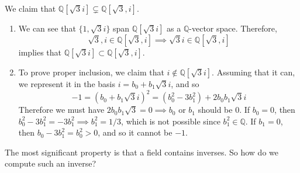   \begin{example}
    We claim that $\mathbb{Q}[\sqrt{3} i] \subsetneq \mathbb{Q}[\sqrt{3}, i]$. 
    \begin{enumerate}
      \item We can see that $\{1, \sqrt{3}i \}$ span $\mathbb{Q}[\sqrt{3}i ]$ as a $\mathbb{Q}$-vector space. Therefore, 
      \begin{equation}
        \sqrt{3}, i \in \mathbb{Q}[\sqrt{3}, i] \implies \sqrt{3} i \in \mathbb{Q}[\sqrt{3}, i]
      \end{equation} 
      implies that $\mathbb{Q}[\sqrt{3} i] \subset \mathbb{Q}[\sqrt{3}, i]$. 

      \item To prove proper inclusion, we claim that $i \not\in \mathbb{Q}[\sqrt{3}i]$. Assuming that it can, we represent it in the basis $i = b_0 + b_1 \sqrt{3} i$, and so
      \begin{equation}
        -1 = (b_0 + b_1 \sqrt{3} i)^2 = (b_0^2 - 3b_1^2) + 2b_0 b_1 \sqrt{3} i
      \end{equation}
      Therefore we must have $2b_0 b_1 \sqrt{3} = 0 \implies b_0$ or $b_1$ should be $0$. If $b_0 = 0$, then $b_0^2 - 3b_1^2 = -3 b_1^2 \implies b_1^2 = 1/3$, which is not possible since $b_1^2 \in \mathbb{Q}$. If $b_1 = 0$, then $b_0 - 3 b_1^2 = b_0^2 > 0$, and so it cannot be $-1$. 
    \end{enumerate}
  \end{example}

  The most significant property is that a field contains inverses. So how do we compute such an inverse? 


